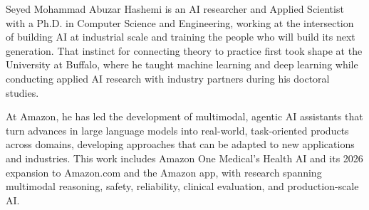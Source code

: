 
Seyed Mohammad Abuzar Hashemi is an AI researcher and Applied Scientist with a Ph.D. in Computer Science and Engineering, working at the intersection of building AI at industrial scale and training the people who will build its next generation. That instinct for connecting theory to practice first took shape at the University at Buffalo, where he taught machine learning and deep learning while conducting applied AI research with industry partners during his doctoral studies.

At Amazon, he has led the development of multimodal, agentic AI assistants that turn advances in large language models into real-world, task-oriented products across domains, developing approaches that can be adapted to new applications and industries. This work includes Amazon One Medical's Health AI and its 2026 expansion to Amazon.com and the Amazon app, with research spanning multimodal reasoning, safety, reliability, clinical evaluation, and production-scale AI.